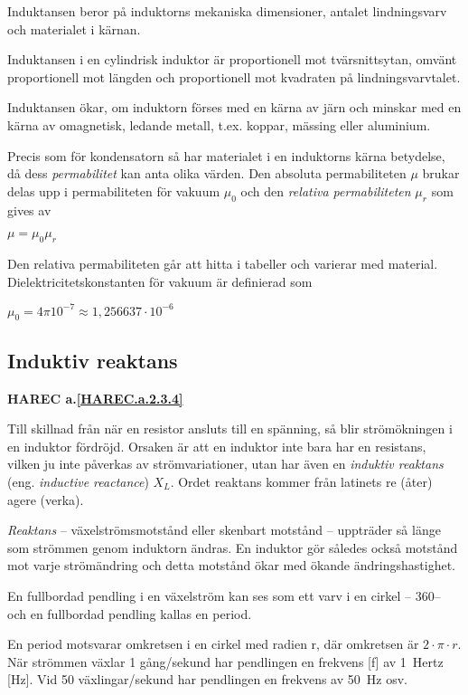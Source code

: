 Induktansen beror på induktorns mekaniska dimensioner, antalet lindningsvarv och
materialet i kärnan.

Induktansen i en cylindrisk induktor är proportionell mot tvärsnittsytan, omvänt
proportionell mot längden och proportionell mot kvadraten på lindningsvarvtalet.

Induktansen ökar, om induktorn förses med en kärna av järn och minskar med en
kärna av omagnetisk, ledande metall, t.ex. koppar, mässing eller aluminium.

Precis som för kondensatorn så har materialet i en induktorns kärna betydelse,
då dess \emph{permabilitet} kan anta olika värden. Den absoluta permabiliteten
\(\mu\) brukar delas upp i permabiliteten för vakuum \(\mu_0\) och den
\emph{relativa permabiliteten} \(\mu_r\) som gives av

\(\mu = \mu_0\mu_r\)

Den relativa permabiliteten går att hitta i tabeller och varierar med material.
Dielektricitetskonstanten för vakuum är definierad som

\(\mu_0 = 4\pi 10^{-7} \approx 1,256637 \cdot 10^{-6}\)

\subsection{Induktiv reaktans}
\textbf{HAREC a.\ref{HAREC.a.2.3.4}\label{myHAREC.a.2.3.4}}

Till skillnad från när en resistor ansluts till en spänning, så blir
strömökningen i en induktor fördröjd. Orsaken är att en induktor inte bara har
en resistans, vilken ju inte påverkas av strömvariationer, utan har även en
\emph{induktiv reaktans} (eng. \emph{inductive reactance}) \(X_L\).
Ordet reaktans kommer från latinets re (åter) agere (verka).

\emph{Reaktans} -- växelströmsmotstånd eller skenbart motstånd -- uppträder så
länge som strömmen genom induktorn ändras. En induktor gör således också
motstånd mot varje strömändring och detta motstånd ökar med ökande
ändringshastighet.

En fullbordad pendling i en växelström kan ses som ett varv i en cirkel --
360\degree -- och en fullbordad pendling kallas en period.

En period motsvarar omkretsen i en cirkel med radien r, där omkretsen är
\(2 \cdot \pi  \cdot r\). När strömmen växlar 1 gång/sekund har
pendlingen en frekvens [f] av 1~Hertz [Hz]. Vid 50 växlingar/sekund har
pendlingen en frekvens av 50~Hz osv.

